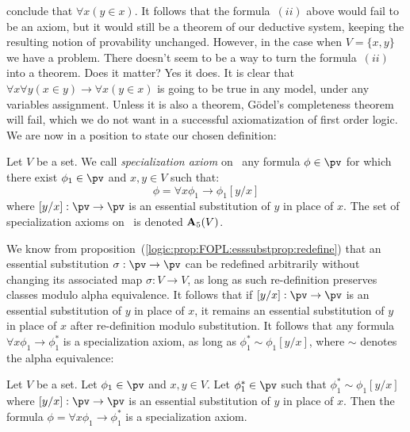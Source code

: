 conclude that $\forall x(y\in x)$. It follows that the
formula~$(ii)$ above would fail to be an axiom, but it would still
be a theorem of our deductive system, keeping the resulting notion
of provability unchanged. However, in the case when $V=\{x,y\}$ we
have a problem. There doesn't seem to be a way to turn the
formula~$(ii)$ into a theorem. Does it matter? Yes it does. It is
clear that $\forall x\forall y(x\in y)\to\forall x(y\in x)$ is going
to be true in any model, under any variables assignment. Unless it
is also a theorem, G\"odel's completeness theorem will fail, which
we do not want in a successful axiomatization of first order logic.
We are now in a position to state our chosen definition:
\begin{defin}\label{logic:def:FOPL:specialization:axiom}
Let $V$ be a set. We call {\em specialization axiom} on \pv\ any
formula $\phi\in\pv$ for which there exist $\phi_{1}\in\pv$ and
$x,y\in V$ such that:
    \[
    \phi =\forall x\phi_{1}\to\phi_{1}[y/x]
    \]
where $[y/x]:\pv\to\pv$ is an essential substitution of $y$ in place
of $x$. The set of specialization axioms on \pv\ is denoted ${\bf
A}_{5}(V)$.
\end{defin}
We know from
proposition~(\ref{logic:prop:FOPL:esssubstprop:redefine}) that an
essential substitution $\sigma:\pv\to\pv$ can be redefined
arbitrarily without changing its associated map $\sigma:V\to V$, as
long as such re-definition preserves classes modulo alpha equivalence. 
It follows that if $[y/x]:\pv\to\pv$ is an essential
substitution of $y$ in place of $x$, it remains an essential
substitution of $y$ in place of $x$ after re-definition modulo
substitution. It follows that any formula $\forall
x\phi_{1}\to\phi_{1}^{*}$ is a specialization axiom, as long as
$\phi_{1}^{*}\sim\phi_{1}[y/x]$, where $\sim$ denotes the
alpha equivalence:
\begin{prop}\label{logic:prop:FOPL:specialization:axiom:2}
Let $V$ be a set. Let $\phi_{1}\in\pv$ and $x,y\in V$. Let
$\phi_{1}^{*}\in\pv$ such that $\phi_{1}^{*}\sim\phi_{1}[y/x]$ where
$[y/x]:\pv\to\pv$ is an essential substitution of $y$ in place of
$x$. Then the formula $\phi=\forall x\phi_{1}\to\phi_{1}^{*}$ is a
specialization axiom.
\end{prop}
